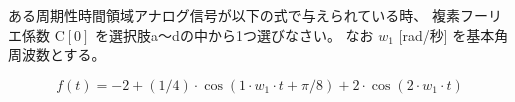 ある周期性時間領域アナログ信号が以下の式で与えられている時、
複素フーリエ係数 $\textrm{C}[0]$ を選択肢a〜dの中から1つ選びなさい。
なお $w_1$ [rad/秒] を基本角周波数とする。

\[
f(t) = 
-2
+ (1/4) \cdot \cos( 1 \cdot w_1 \cdot t + \pi/8 )
+ 2 \cdot \cos( 2 \cdot w_1 \cdot t)
\]
